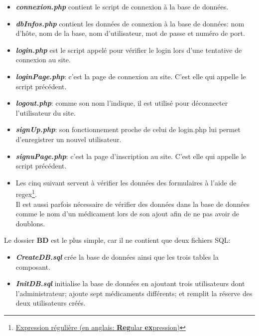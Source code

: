 \begin{itemize}

    \item \textbf{\textit{connexion.php}} contient le script de connexion à la base de données.
    
    \item \textbf{\textit{dbInfos.php}} contient les données de connexion à la base de données: nom d’hôte, nom de la base, nom d’utilisateur, mot de passe et numéro de port.
    
    \item \textbf{\textit{login.php}} est le script appelé pour vérifier le login lors d’une tentative de connexion au site.
    
    \item \textbf{\textit{loginPage.php}}: c’est la page de connexion au site. C’est elle qui appelle le script précédent.
    
    \item \textbf{\textit{logout.php}}: comme son nom l’indique, il est utilisé pour déconnecter l’utilisateur du site.
    
    \item \textbf{\textit{signUp.php}}: son fonctionnement proche de celui de login.php lui permet d’enregistrer un nouvel utilisateur.
    
    \item \textbf{\textit{signuPage.php}}: c’est la page d’inscription au site. C’est elle qui appelle le script précédent.
    
    \item Les cinq suivant servent à vérifier les données des formulaires à l’aide de regex\footnote{\href{https://fr.wikipedia.org/wiki/Expression\_rationnelle}{Expression régulière (en anglais: \textbf{Reg}ular \textbf{ex}pression)}}.\\
    Il est aussi parfois nécessaire de vérifier des données dans la base de données comme le nom d’un médicament lors de son ajout afin de ne pas avoir de doublons.\\

\end{itemize}

Le dossier \textbf{BD} est le plus simple, car il ne contient que deux fichiers SQL:

\begin{itemize}

    \item \textbf{\textit{CreateDB.sql}} crée la base de données ainsi que les trois tables la composant.
    
    \item \textbf{\textit{InitDB.sql}} initialise la base de données en ajoutant trois utilisateurs dont l’administrateur; ajoute sept médicaments différents; et remplit la réserve des deux utilisateurs créés.

\end{itemize}

